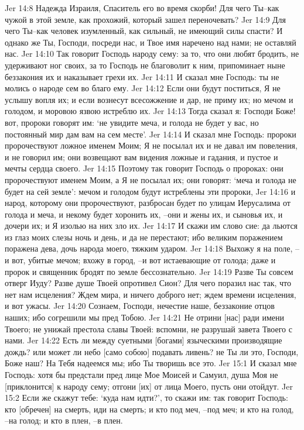 Jer 14:8  Надежда Израиля, Спаситель его во время скорби! Для чего Ты--как чужой в этой земле, как прохожий, который зашел переночевать?
Jer 14:9  Для чего Ты--как человек изумленный, как сильный, не имеющий силы спасти? И однако же Ты, Господи, посреди нас, и Твое имя наречено над нами; не оставляй нас.
Jer 14:10  Так говорит Господь народу сему: за то, что они любят бродить, не удерживают ног своих, за то Господь не благоволит к ним, припоминает ныне беззакония их и наказывает грехи их.
Jer 14:11  И сказал мне Господь: ты не молись о народе сем во благо ему.
Jer 14:12  Если они будут поститься, Я не услышу вопля их; и если вознесут всесожжение и дар, не приму их; но мечом и голодом, и моровою язвою истреблю их.
Jer 14:13  Тогда сказал я: Господи Боже! вот, пророки говорят им: `не увидите меча, и голода не будет у вас, но постоянный мир дам вам на сем месте'.
Jer 14:14  И сказал мне Господь: пророки пророчествуют ложное именем Моим; Я не посылал их и не давал им повеления, и не говорил им; они возвещают вам видения ложные и гадания, и пустое и мечты сердца своего.
Jer 14:15  Поэтому так говорит Господь о пророках: они пророчествуют именем Моим, а Я не посылал их; они говорят: `меча и голода не будет на сей земле': мечом и голодом будут истреблены эти пророки,
Jer 14:16  и народ, которому они пророчествуют, разбросан будет по улицам Иерусалима от голода и меча, и некому будет хоронить их, --они и жены их, и сыновья их, и дочери их; и Я изолью на них зло их.
Jer 14:17  И скажи им слово сие: да льются из глаз моих слезы ночь и день, и да не перестают; ибо великим поражением поражена дева, дочь народа моего, тяжким ударом.
Jer 14:18  Выхожу я на поле, --и вот, убитые мечом; вхожу в город, --и вот истаевающие от голода; даже и пророк и священник бродят по земле бессознательно.
Jer 14:19  Разве Ты совсем отверг Иуду? Разве душе Твоей опротивел Сион? Для чего поразил нас так, что нет нам исцеления? Ждем мира, и ничего доброго нет; ждем времени исцеления, и вот ужасы.
Jer 14:20  Сознаем, Господи, нечестие наше, беззаконие отцов наших; ибо согрешили мы пред Тобою.
Jer 14:21  Не отрини [нас] ради имени Твоего; не унижай престола славы Твоей: вспомни, не разрушай завета Твоего с нами.
Jer 14:22  Есть ли между суетными [богами] языческими производящие дождь? или может ли небо [само собою] подавать ливень? не Ты ли это, Господи, Боже наш? На Тебя надеемся мы; ибо Ты творишь все это.
Jer 15:1  И сказал мне Господь: хотя бы предстали пред лице Мое Моисей и Самуил, душа Моя не [приклонится] к народу сему; отгони [их] от лица Моего, пусть они отойдут.
Jer 15:2  Если же скажут тебе: `куда нам идти?', то скажи им: так говорит Господь: кто [обречен] на смерть, иди на смерть; и кто под меч, --под меч; и кто на голод, --на голод; и кто в плен, --в плен.
